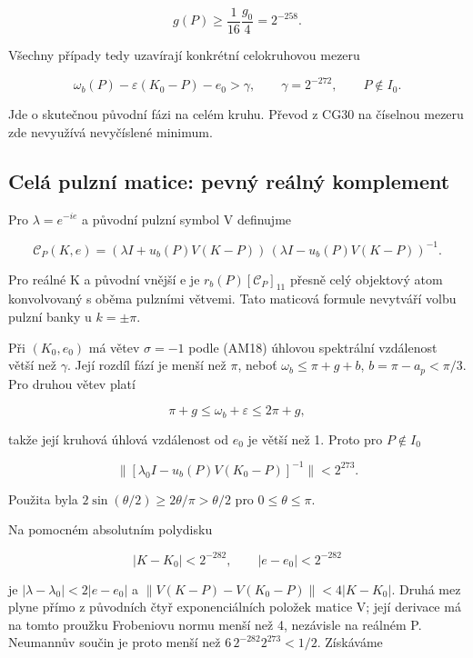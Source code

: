 \documentclass[11pt,a4paper]{article}
\theoremstyle{remark}\newtheorem{remark}[theorem]{Poznámka}
\numberwithin{equation}{section}
\begin{document}
\[
g(P)\ge\frac1{16}\frac{g_0}{4}=2^{-258}.
\]

Všechny případy tedy uzavírají konkrétní celokruhovou mezeru

\[
\boxed{
\omega_b(P)-\varepsilon(K_0-P)-e_0>\gamma,
\qquad\gamma=2^{-272},\qquad P\notin I_0.}
\tag{AM18}
\]

Jde o skutečnou původní fázi na celém kruhu. Převod z CG30 na číselnou
mezeru zde nevyužívá nevyčíslené minimum.

\hypertarget{celuxe1-pulznuxed-matice-pevnuxfd-reuxe1lnuxfd-komplement}{%
\subsection{Celá pulzní matice: pevný reálný
komplement}\label{celuxe1-pulznuxed-matice-pevnuxfd-reuxe1lnuxfd-komplement}}

Pro \(\lambda=e^{-ie}\) a původní pulzní symbol V definujme

\[
\boxed{
\mathcal C_P(K,e)=
(\lambda I+u_b(P)V(K-P))
\, (\lambda I-u_b(P)V(K-P))^{-1}.}
\tag{AM19}
\]

Pro reálné K a původní vnější e je \(r_b(P)[\mathcal C_P]_{11}\) přesně
celý objektový atom konvolvovaný s oběma pulzními větvemi. Tato maticová
formule nevytváří volbu pulzní banky u \(k=\pm\pi\).

Při \((K_0,e_0)\) má větev \(\sigma=-1\) podle (AM18) úhlovou spektrální
vzdálenost větší než \(\gamma\). Její rozdíl fází je menší než \(\pi\),
neboť \(\omega_b\le\pi+g+b\), \(b=\pi-a_p<\pi/3\). Pro druhou větev
platí

\[
\pi+g\le\omega_b+\varepsilon\le2\pi+g,
\]

takže její kruhová úhlová vzdálenost od \(e_0\) je větší než 1. Proto
pro \(P\notin I_0\)

\[
\|[\lambda_0I-u_b(P)V(K_0-P)]^{-1}\|<2^{273}.
\tag{AM20}
\]

Použita byla \(2\sin(\theta/2)\ge2\theta/\pi>\theta/2\) pro
\(0\le\theta\le\pi\).

Na pomocném absolutním polydisku

\[
|K-K_0|<2^{-282},\qquad |e-e_0|<2^{-282}
\tag{AM21}
\]

je \(|\lambda-\lambda_0|<2|e-e_0|\) a \(\|V(K-P)-V(K_0-P)\|<4|K-K_0|\).
Druhá mez plyne přímo z původních čtyř exponenciálních položek matice V;
její derivace má na tomto proužku Frobeniovu normu menší než 4,
nezávisle na reálném P. Neumannův součin je proto menší než
\(6\,2^{-282}2^{273}<1/2\). Získáváme
\end{document}

